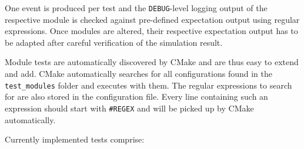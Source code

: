 One event is produced per test and the \texttt{DEBUG}-level logging output of the respective module is checked against pre-defined expectation output using regular expressions.
Once modules are altered, their respective expectation output has to be adapted after careful verification of the simulation result.

Module tests are automatically discovered by CMake and are thus easy to extend and add.
CMake automatically searches for all configurations found in the \texttt{test\_modules} folder and executes \apsq with them.
The regular expressions to search for are also stored in the configuration file.
Every line containing such an expression should start with \texttt{\#REGEX} and will be picked up by CMake automatically.

Currently implemented tests comprise:

